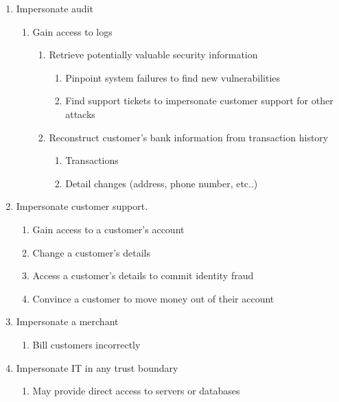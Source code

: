 \begin{enumerate}
    \item Impersonate audit \label{impersonateAudit}
    \begin{enumerate}
        \item Gain access to logs
        \begin{enumerate}
            \item Retrieve potentially valuable security information
            \begin{enumerate}
                \item Pinpoint system failures to find new vulnerabilities
                \item Find support tickets to impersonate customer support for other attacks
            \end{enumerate}

            \item Reconstruct customer’s bank information from transaction history
            \begin{enumerate}
                \item Transactions
                \item Detail changes (address, phone number, etc..)
            \end{enumerate}
        \end{enumerate}
    \end{enumerate}
    
    \item \label{impersonateCustomerSupport} Impersonate customer support.
    \begin{enumerate}
        \item Gain access to a customer's account
        \item Change a customer's details
        \item Access a customer's details to commit identity fraud
        \item Convince a customer to move money out of their account
    \end{enumerate}

    \item \label{impersonateMerchant} Impersonate a merchant
    \begin{enumerate}
        \item Bill customers incorrectly
    \end{enumerate}

    \item \label{impersonateIt} Impersonate IT in any trust boundary
    \begin{enumerate}
        \item May provide direct access to servers or databases
    \end{enumerate}


\end{enumerate}
